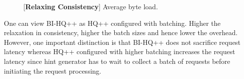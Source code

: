 \documentclass[twocolumn,10pt]{article}
\begin{document}
\begin{figure}[t]
\centering
\begin{minipage}[t]{0.47\textwidth}
\caption{\label{fig:mesg_comp_bi}[\textbf{Relaxed Consistency}] Average message load.}
\end{minipage}
\begin{minipage}[t]{0.47\textwidth}
\caption{\label{fig:bytes_comp_bi_new}[\textbf{Relaxing Consistency}] Average byte load.}
\end{minipage}
\end{figure}

 One can view BI-HQ++ as HQ++ configured with 
batching. Higher the relaxation in consistency, higher the batch sizes and hence lower the overhead. 
However, one important distinction
is that BI-HQ++ does not sacrifice request latency whereas HQ++ configured with higher batching increases
the request latency since hint generator has to wait to collect a batch of requests before initiating
the request processing.
\end{document}
